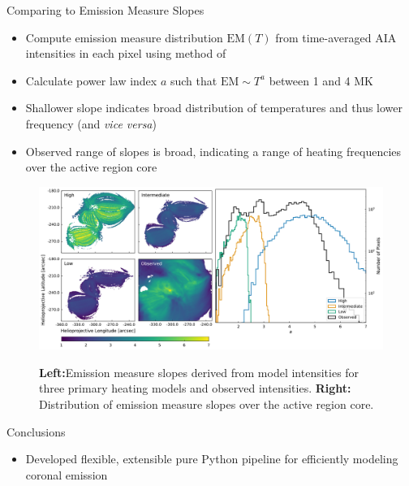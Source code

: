 \documentclass[final,12pt]{beamer}
\begin{document}
\begin{frame}
\begin{columns}[T]
\begin{column}{0.49\linewidth}
    \begin{block}{Comparing to Emission Measure Slopes}
      \vspace{-1ex}
      \begin{itemize}
        \item Compute emission measure distribution $\text{EM}(T)$ from time-averaged AIA intensities in each pixel using method of \citet{hannah_differential_2012}
        \item Calculate power law index $a$ such that $\text{EM}\sim T^a$ between 1 and 4 MK
        \item Shallower slope indicates broad distribution of temperatures and thus lower frequency (and \textit{vice versa}) \citep[see][and references therein]{bradshaw_diagnosing_2012,warren_systematic_2012}
        \item Observed range of slopes is broad, \alert{indicating a range of heating frequencies over the active region core}
      \end{itemize}
      \begin{figure}
        \includegraphics{../figures/em_slopes}
        \label{fig:em_slopes}
        \caption{\textbf{Left:}Emission measure slopes derived from model intensities for three primary heating models and observed intensities. \textbf{Right:} Distribution of emission measure slopes over the active region core.}
      \end{figure}
      \vspace{-2ex}
    \end{block}
    \begin{block}{Conclusions}
      \vspace{-1ex}
      \begin{itemize}
        \item Developed flexible, extensible pure Python pipeline for efficiently modeling coronal emission 

\end{itemize}
\end{block}
\end{column}
\end{columns}
\end{frame}
\end{document}

